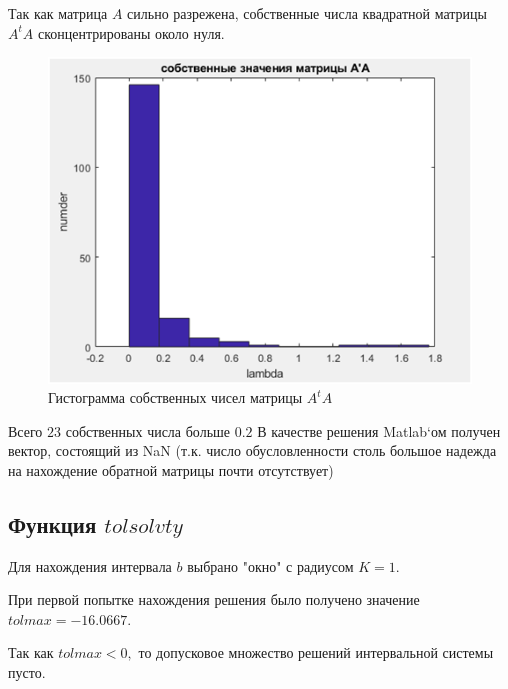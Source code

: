 \documentclass[a4]{article}
\begin{document}
Так как матрица $A$ сильно разрежена, собственные числа квадратной матрицы $A^tA$ сконцентрированы около нуля.
\begin{figure}[H]
\begin{center}
\caption{Гистограмма собственных чисел матрицы $A^tA$}
\includegraphics{pic1.png} 
\end{center}
\end{figure}

Всего $23$ собственных числа больше $0.2$
В качестве решения Matlab`ом получен вектор, состоящий из NaN (т.к. число обусловленности столь большое надежда на нахождение обратной матрицы почти отсутствует)

\subsection{Функция $tolsolvty$}
Для нахождения интервала $b$ выбрано "окно" с радиусом $K=1.$

При первой попытке нахождения решения было получено значение $tolmax = -16.0667.$

Так как $tolmax < 0,$ то допусковое множество решений интервальной системы пусто.
\end{document}
